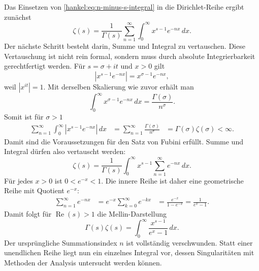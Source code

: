 Das Einsetzen von \eqref{hankel:eq:n-minus-s-integral} in die Dirichlet-Reihe ergibt zunächst
\begin{equation}
\zeta(s)
=
\frac{1}{\Gamma(s)}
\sum_{n=1}^{\infty}
\int_0^\infty
x^{s-1}e^{-nx}
\,dx.
\label{hankel:eq:summe-von-integralen}
\end{equation}
Der nächste Schritt besteht darin, Summe und Integral zu vertauschen. 
Diese Vertauschung ist nicht rein formal, sondern muss durch absolute Integrierbarkeit gerechtfertigt werden. 
Für $s=\sigma+it$ und $x>0$ gilt
\begin{equation}
|x^{s-1}e^{-nx}|
=
x^{\sigma-1}e^{-nx},
\label{hankel:eq:betrag-integrand}
\end{equation}
weil $|x^{it}|=1$. 
Mit derselben Skalierung wie zuvor erhält man
\begin{equation}
\int_0^\infty x^{\sigma-1}e^{-nx}\,dx
=
\frac{\Gamma(\sigma)}{n^\sigma}.
\label{hankel:eq:betrag-skaliert}
\end{equation}
Somit ist für $\sigma>1$
\begin{equation}
\begin{aligned}
\sum_{n=1}^{\infty}
\int_0^\infty
|x^{s-1}e^{-nx}|\,dx
&=
\sum_{n=1}^{\infty}
\frac{\Gamma(\sigma)}{n^\sigma}
&=
\Gamma(\sigma)\zeta(\sigma)
<\infty.
\end{aligned}
\label{hankel:eq:fubini-majorante}
\end{equation}
Damit sind die Voraussetzungen für den Satz von Fubini erfüllt. 
%
Summe und Integral dürfen also vertauscht werden:
\begin{equation}
\zeta(s)
=
\frac{1}{\Gamma(s)}
\int_0^\infty
x^{s-1}
\sum_{n=1}^{\infty}e^{-nx}
\,dx.
\label{hankel:eq:integral-der-summe}
\end{equation}
Für jedes $x>0$ ist $0<e^{-x}<1$. 
Die innere Reihe ist daher eine geometrische Reihe mit Quotient $e^{-x}$:
\begin{equation}
\begin{aligned}
\sum_{n=1}^{\infty}e^{-nx}
&=
e^{-x}\sum_{k=0}^{\infty}e^{-kx}
&=
\frac{e^{-x}}{1-e^{-x}}
=
\frac{1}{e^x-1}.
\end{aligned}
\label{hankel:eq:geometrische-reihe}
\end{equation}
Damit folgt für $\operatorname{Re}(s)>1$ die Mellin-Darstellung
\begin{equation}
\boxed{
\Gamma(s)\zeta(s)
=
\int_0^\infty
\frac{x^{s-1}}{e^x-1}
\,dx.
}
\label{hankel:eq:mellin-darstellung}
\end{equation}
Der ursprüngliche Summationsindex $n$ ist vollständig verschwunden. 
Statt einer unendlichen Reihe liegt nun ein einzelnes Integral vor, dessen Singularitäten mit Methoden der Analysis untersucht werden können.

